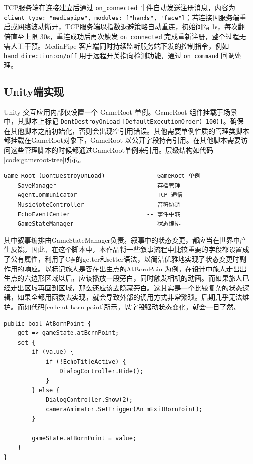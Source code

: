 \documentclass[bachelor]{njupthesis}
\begin{document}
TCP服务端在连接建立后通过 \texttt{on\_connected} 事件自动发送注册消息，内容为 \texttt{client\_type: "mediapipe", modules: ["hands", "face"]}；若连接因服务端重启或网络波动断开，TCP服务端以指数退避策略自动重连，初始间隔 1s，每次翻倍直至上限 30s，重连成功后再次触发 \texttt{on\_connected} 完成重新注册，整个过程无需人工干预。MediaPipe 客户端同时持续监听服务端下发的控制指令，例如 \texttt{hand\_direction:on/off} 用于远程开关指向检测功能，通过 \texttt{on\_command} 回调处理。

\subsection{Unity端实现}

Unity 交互应用内部仅设置一个 GameRoot 单例。GameRoot 组件挂载于场景中，其脚本上标记 \texttt{DontDestroyOnLoad} \texttt{[DefaultExecutionOrder(-100)]}。确保在其他脚本之前初始化，否则会出现空引用错误。其他需要单例性质的管理类脚本都挂载在GameRoot对象下，GameRoot 以公开字段持有引用。在其他脚本需要访问这些管理脚本的时候都通过GameRoot单例来引用。层级结构如代码\ref{code:gameroot-tree}所示。

\begin{code}
\caption{GameRoot 层级结构}
\label{code:gameroot-tree}
\lstset{style=codeblock}
\begin{lstlisting}
Game Root (DontDestroyOnLoad)            -- GameRoot 单例
    SaveManager                          -- 存档管理
    AgentCommunicator                    -- TCP 通信
    MusicNoteController                  -- 音符协调
    EchoEventCenter                      -- 事件中转
    GameStateManager                     -- 状态编排
\end{lstlisting}
\end{code}

其中叙事编排由GameStateManager负责。叙事中的状态变更，都应当在世界中产生反馈。因此，在这个脚本中，本作品将一些叙事流程中比较重要的字段都设置成了公有属性，利用了C\#的getter和setter语法，以简洁优雅地实现了状态变更时副作用的响应。以标记旅人是否在出生点的AtBornPoint为例，在设计中旅人走出出生点的六边形区域以后，应该播放一段旁白，同时触发相机的动画。而如果旅人已经走出区域再回到区域，那么还应该去隐藏旁白。这其实是一个比较复杂的状态逻辑，如果全都用函数去实现，就会导致外部的调用方式非常繁琐。后期几乎无法维护。而如代码\ref{code:at-born-point}所示，以字段驱动状态变化，就会一目了然。

\begin{code}
\caption{GameStateManager标识旅人是否在出生点的状态字段}
\label{code:at-born-point}
\lstset{style=codeblock}
\begin{lstlisting}
public bool AtBornPoint {
    get => gameState.atBornPoint;
    set {
        if (value) {
            if (!EchoTitleActive) {
                DialogController.Hide();
            }
        } else {
            DialogController.Show(2);
            cameraAnimator.SetTrigger(AnimExitBornPoint);
        }

        gameState.atBornPoint = value;
    }
}
\end{lstlisting}
\end{code}
\end{document}
